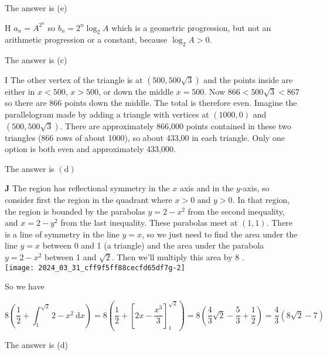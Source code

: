 \documentclass[10pt]{article}
\begin{document}
The answer is (e)

H $a_{n}=A^{2^{n}}$ so $b_{n}=2^{n} \log _{2} A$ which is a geometric progression, but not an arithmetic progression or a constant, because $\log _{2} A>0$.

The answer is (c)

I The other vertex of the triangle is at $(500,500 \sqrt{3})$ and the points inside are either in $x<500$, $x>500$, or down the middle $x=500$. Now $866<500 \sqrt{3}<867$ so there are 866 points down the middle. The total is therefore even. Imagine the parallelogram made by adding a triangle with vertices at $(1000,0)$ and $(500,500 \sqrt{3})$. There are approximately 866,000 points contained in these two triangles (866 rows of about 1000), so about 433,00 in each triangle. Only one option is both even and approximately 433,000.

The answer is $(\mathrm{d})$

$\mathbf{J}$ The region has reflectional symmetry in the $x$ axis and in the $y$-axis, so consider first the region in the quadrant where $x>0$ and $y>0$. In that region, the region is bounded by the parabolas $y=2-x^{2}$ from the second inequality, and $x=2-y^{2}$ from the last inequality. These parabolas meet at $(1,1)$. There is a line of symmetry in the line $y=x$, so we just need to find the area under the line $y=x$ between 0 and 1 (a triangle) and the area under the parabola $y=2-x^{2}$ between 1 and $\sqrt{2}$. Then we'll multiply this area by 8 .\\
\texttt{[image: 2024\_03\_31\_cff9f5ff88cecfd65df7g-2]}

So we have

$$
8\left(\frac{1}{2}+\int_{1}^{\sqrt{2}} 2-x^{2} \mathrm{~d} x\right)=8\left(\frac{1}{2}+\left[2 x-\frac{x^{3}}{3}\right]_{1}^{\sqrt{2}}\right)=8\left(\frac{4}{3} \sqrt{2}-\frac{5}{3}+\frac{1}{2}\right)=\frac{4}{3}(8 \sqrt{2}-7)
$$

The answer is (d)
\end{document}
